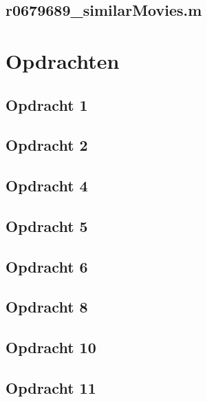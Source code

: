 \documentclass[11pt, a4paper, titlepage, openright]{article}
\begin{document}
    \subsection{r0679689\_similarMovies.m}
        

\section{Opdrachten}

	\subsection{Opdracht 1}
		
	\subsection{Opdracht 2}
		
	\subsection{Opdracht 4}
    \label{appendix:ex4}
		
    \subsection{Opdracht 5}
        
    \subsection{Opdracht 6}
        
    \subsection{Opdracht 8}
        \label{appendix:ex8}
        
	\subsection{Opdracht 10}
        \label{appendix:ex10}
		
	\subsection{Opdracht 11}
		
\end{document}
